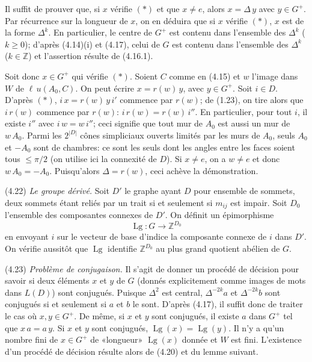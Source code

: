 \documentclass[12pt]{article}
\theoremstyle{remark}
\newcommand{\Z}{\mathbb{Z}}
\begin{document}
Il suffit de prouver que, si $x$ vérifie $(*)$ et que $x \neq e$, alors $x = \Delta \, y$ avec $y \in G^+$. Par récurrence sur la longueur de $x$, on en déduira que si $x$ vérifie $(*)$, $x$ est de la forme $\Delta^k$. En particulier, le centre de $G^+$ est contenu dans l'ensemble des $\Delta^k$ ($k \geq 0$); d'après (4.14)(i) et (4.17), celui de $G$ est contenu dans l'ensemble des $\Delta^k$ ($k \in \Z$) et l'assertion résulte de (4.16.1).

Soit donc $x \in G^+$ qui vérifie $(*)$. Soient $C$ comme en (4.15) et $w$ l'image dans $W$ de $\ell \, u(A_0, C)$. On peut écrire $x = r(w) \, y$, avec $y \in G^+$. Soit $i \in D$. D'après $(*)$, $i \, x = r(w) \, y \, i'$ commence par $r(w)$; de (1.23), on tire alors que $i \, r(w)$ commence par $r(w)$: $i \, r(w) = r(w) \, i''$. En particulier, pour tout $i$, il existe $i''$ avec $i \, w = w \, i''$; ceci signifie que tout mur de $A_0$ est aussi un mur de $w \, A_0$. Parmi les $2^{|D|}$ cônes simpliciaux ouverts limités par les murs de $A_0$, seuls $A_0$ et $-A_0$ sont de chambres: ce sont les seuls dont les angles entre les faces soient tous $\leq \pi/2$ (on utilise ici la connexité de $D$). Si $x \neq e$, on a $w \neq e$ et donc $w \, A_0 = -A_0$. Puisqu'alors $\Delta = r(w)$, ceci achève la démonstration.

(4.22) \emph{Le groupe dérivé.} Soit $D'$ le graphe ayant $D$ pour ensemble de sommets, deux sommets étant reliés par un trait si et seulement si $m_{ij}$ est impair. Soit $D_0$ l'ensemble des composantes connexes de $D'$. On définit un épimorphisme
\[\operatorname{Lg} \colon G \to \Z^{D_0}\]
en envoyant $i$ sur le vecteur de base d'indice la composante connexe de $i$ dans $D'$. On vérifie aussitôt que $\operatorname{Lg}$ identifie $\Z^{D_0}$ au plus grand quotient abélien de $G$.

(4.23) \emph{Problème de conjugaison.} Il s'agit de donner un procédé de décision pour savoir si deux éléments $x$ et $y$ de $G$ (donnés explicitement comme images de mots dans $L(D)$) sont conjugués. Puisque $\Delta^2$ est central, $\Delta^{-2k} a$ et $\Delta^{-2k} b$ sont conjugués si et seulement si $a$ et $b$ le sont. D'après (4.17), il suffit donc de traiter le cas où $x, y \in G^+$. De même, si $x$ et $y$ sont conjugués, il existe $a$ dans $G^+$ tel que $x \, a = a \, y$. Si $x$ et $y$ sont conjugués, $\operatorname{Lg}(x) = \operatorname{Lg}(y)$. Il n'y a qu'un nombre fini de $x \in G^+$ de «longueur» $\operatorname{Lg}(x)$ donnée et $W$ est fini. L'existence d'un procédé de décision résulte alors de (4.20) et du lemme suivant.
\end{document}
